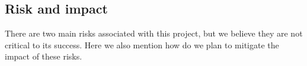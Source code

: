 

\subsection*{Risk and impact}

%


There are two main risks associated with this project, but we believe they are not critical to its success. Here we also mention how do we plan to mitigate the impact of these risks.

